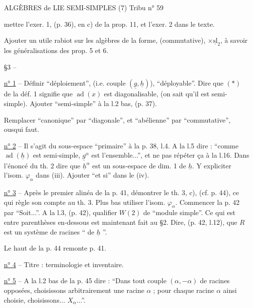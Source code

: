 ALGÈBRES de LIE SEMI-SIMPLES (7) \hfill Tribu n° 59

mettre l'exer. 1, (p. 36), en c) de la prop. 11, et l'exer. 2 dans le texte.

Ajouter un utile rabiot sur les algèbres de la forme, (commutative), $\times\underline{\mathrm{sl}}_2$, à savoir les généralisations des prop. 5 et 6.

\S 3 -- 

\uline{n° 1} -- Définir ``déploiement'', (i.e. couple $(\underline g,\underline h)$), ``déployable''. Dire que $(*)$ de la déf. 1 signifie que $\operatorname{ad}(x)$ est diagonalisable, (on sait qu'il est semi-simple). Ajouter ``semi-simple'' à la l.2 bas, (p. 37).

Remplacer ``canonique'' par ``diagonale'', et ``abélienne'' par ``commutative'', ousqui faut.

\uline{n° 2} -- Il s'agit du sous-espace ``primaire'' à la p. 38, l.4. A la l.5 dire : ``comme $\operatorname{ad}(\underline h)$ est semi-simple, $\underline g^\alpha$ est l'ensemble...'', et ne pas répéter ça à la l.16. Dans l'énoncé du th. 2 dire que $\underline h^\alpha$ est un sous-espace de dim. 1 de $\underline h$. Y expliciter l'isom. $\varphi_\alpha$ dans (iii). Ajouter ``et si'' dans le (iv).

\uline{n° 3} -- Après le premier alinéa de la p. 41, démontrer le th. 3, c), (cf. p. 44), ce qui règle son compte au th. 3. Plus bas utiliser l'isom. $\varphi_\alpha$. Commencer la p. 42 par ``Soit...''. A la l.3, (p. 42), qualifier $W(2)$ de ``module simple''. Ce qui est entre parenthèses en-dessous est maintenant fait au \S 2. Dire, (p. 42, l.12), que $R$ est un système de racines `` de $\underline h$ ''.

Le haut de la p. 44 remonte p. 41.

\uline{n° 4} -- Titre : terminologie et inventaire.

\uline{n° 5} -- A la l.2 bas de la p. 45 dire : ``Dans tout couple $(\alpha,-\alpha)$ de racines opposées, choisissons arbitrairement une racine $\alpha$ ; pour chaque racine $\alpha$ ainsi choisie, choisissons... $X_\alpha$...''.
